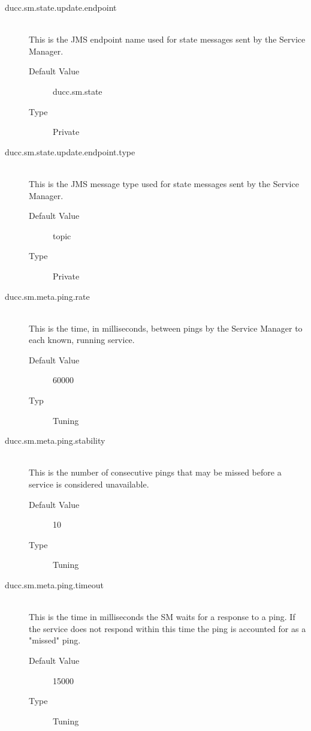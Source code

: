 \begin{description}
      \item[ducc.sm.state.update.endpoint] \hfill \\
        This is the JMS endpoint name used for state messages sent by the Service Manager. 
        \begin{description}
          \item[Default Value] ducc.sm.state 
          \item[Type] Private
        \end{description}
        
      \item[ducc.sm.state.update.endpoint.type] \hfill \\
        This is the JMS message type used for state messages sent by the Service Manager. 
        \begin{description}
          \item[Default Value] topic 
          \item[Type] Private 
        \end{description}          
        
      \item[ducc.sm.meta.ping.rate] \hfill \\
        This is the time, in milliseconds, between pings by the Service Manager
        to each known, running service. 
        \begin{description}          
          \item[Default Value] 60000 
          \item[Typ] Tuning
        \end{description} 
        
      \item[ducc.sm.meta.ping.stability] \hfill \\
        This is the number of consecutive pings that may be missed before a
        service is considered unavailable. 
        \begin{description}
          \item[Default Value] 10 
          \item[Type] Tuning 
        \end{description}

      \item[ducc.sm.meta.ping.timeout] \hfill \\
        This is the time in milliseconds the SM waits for a response to a ping. If the service does 
        not respond within this time the ping is accounted for as a "missed" ping. 
        \begin{description}
          \item[Default Value] 15000 
          \item[Type] Tuning 
        \end{description}
        

\end{description}
